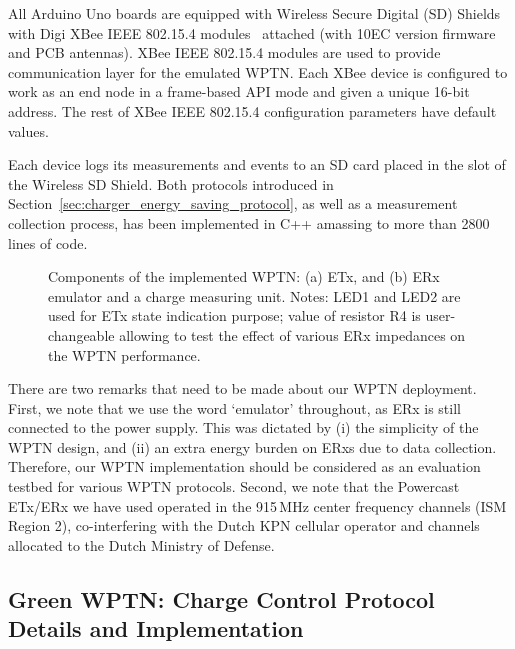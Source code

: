 \documentclass[11pt,draftclsnofoot,journal,onecolumn]{IEEEtran}
\begin{document}
All Arduino Uno boards are equipped with Wireless Secure Digital (SD) Shields~\cite[/ArduinoWirelessShield]{arduino_website} with Digi XBee IEEE 802.15.4 modules~\cite{xbee_website} attached (with 10EC version firmware and PCB antennas). XBee IEEE 802.15.4 modules are used to provide communication layer for the emulated WPTN. Each XBee device is configured to work as an end node in a frame-based API mode and given a unique 16-bit address. The rest of XBee IEEE 802.15.4 configuration parameters have default values. 

Each device logs its measurements and events to an SD card placed in the slot of the Wireless SD Shield. Both protocols introduced in Section~\ref{sec:charger_energy_saving_protocol}, as well as a measurement collection process, has been implemented in C++ amassing to more than 2800 lines of code.

\begin{figure}
\centering
{}
\caption{Components of the implemented WPTN: (a) ETx, and (b) ERx emulator and a charge measuring unit. Notes: LED1 and LED2 are used for ETx state indication purpose; value of resistor R4 is user-changeable allowing to test the effect of various ERx impedances on the WPTN performance.}
\label{fig:wptn_hardware}
\end{figure}

There are two remarks that need to be made about our WPTN deployment. First, we note that we use the word `emulator' throughout, as ERx is still connected to the power supply. This was dictated by (i) the simplicity of the WPTN design, and (ii) an extra energy burden on ERxs due to data collection. Therefore, our WPTN implementation should be considered as an evaluation testbed for various WPTN protocols. Second, we note that the Powercast ETx/ERx we have used operated in the 915\,MHz center frequency channels (ISM Region 2), co-interfering with the Dutch KPN cellular operator and channels allocated to the Dutch Ministry of Defense.

\subsection{Green WPTN: Charge Control Protocol Details and Implementation}
\label{sec:wptn_network_protocol_implementation_experiment}
\end{document}
